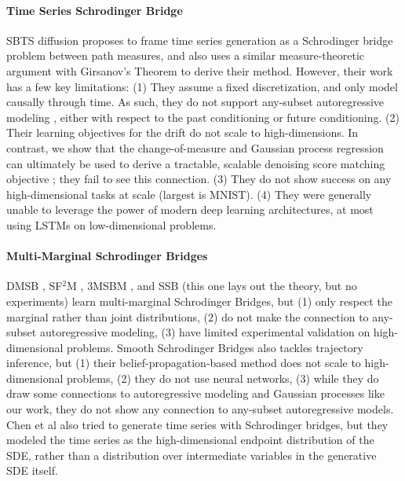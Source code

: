 \paragraph{Time Series Schrodinger Bridge}
SBTS diffusion \cite{hamdouche2023generative, alouadi2025robust} proposes to frame time series generation as a Schrodinger bridge problem between path measures, and also uses a similar measure-theoretic argument with Girsanov's Theorem to derive their method. However, their work has a few key limitations:
(1) They assume a fixed discretization, and only model causally through time. As such, they do not support any-subset autoregressive modeling \cite{guo2025reviving}, either with respect to the past conditioning or future conditioning.
(2) Their learning objectives for the drift do not scale to high-dimensions. In contrast, we show that the change-of-measure and Gaussian process regression can ultimately be used to derive a tractable, scalable denoising score matching objective \cite{vincent2011connection}; they fail to see this connection.
(3) They do not show success on any high-dimensional tasks at scale (largest is MNIST).
(4) They were generally unable to leverage the power of modern deep learning architectures, at most using LSTMs on low-dimensional problems.

\paragraph{Multi-Marginal Schrodinger Bridges}
DMSB \cite{chen2023deep}, SF$^2$M \cite{tong2023simulation}, 3MSBM \cite{theodoropoulos2025momentum}, and SSB \cite{garg2024soft} (this one lays out the theory, but no experiments) learn multi-marginal Schrodinger Bridges, but (1) only respect the marginal rather than joint distributions, (2) do not make the connection to any-subset autoregressive modeling, %
(3) have limited experimental validation on high-dimensional problems. Smooth Schrodinger Bridges \cite{hong2025trajectory} also tackles trajectory inference, but (1) their belief-propagation-based method does not scale to high-dimensional problems, (2) they do not use neural networks, %
(3) while they do draw some connections to autoregressive modeling and Gaussian processes like our work, they do not show any connection to any-subset autoregressive models.
Chen et al \cite{chen2023provably} also tried to generate time series with Schrodinger bridges, but they modeled the time series as the high-dimensional endpoint distribution of the SDE, rather than a distribution over intermediate variables in the generative SDE itself.

